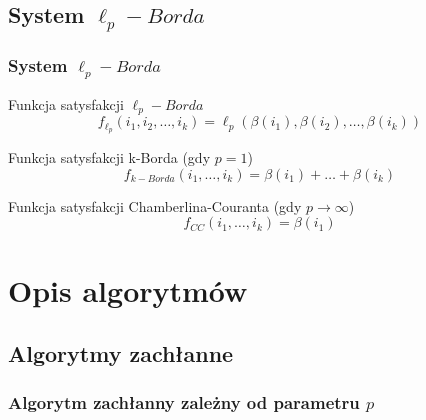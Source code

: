 \documentclass{beamer}
\begin{document}

\subsection{System $\ell_p-Borda$}
\begin{frame}
\frametitle{System $\ell_p-Borda$}

\begin{block}{Funkcja satysfakcji $\ell_p-Borda$}
$$
f_{\ell_p}(i_1, i_2, \ldots, i_k ) = \ell_p(\beta(i_1), \beta(i_2), \ldots ,\beta(i_k))
$$
\end{block}
\vspace{\baselineskip}
\vspace{\baselineskip}

\begin{exampleblock}{Funkcja satysfakcji k-Borda (gdy $p = 1$)}
$$
f_{k-Borda}(i_1, \ldots, i_k) = \beta(i_1) + \ldots + \beta(i_k)
$$
\end{exampleblock}

\begin{exampleblock}{Funkcja satysfakcji Chamberlina-Couranta (gdy $p \to \infty$)}
$$
f_{CC}(i_1, \ldots, i_k) = \beta(i_1)
$$
\end{exampleblock}


\end{frame}

\section{Opis algorytmów}

\subsection{Algorytmy zachłanne}
\begin{frame}
\frametitle{Algorytm zachłanny zależny od parametru $p$}

\begin{algorithm}[H]
{}
\end{algorithm}

\end{frame}
\end{document}
